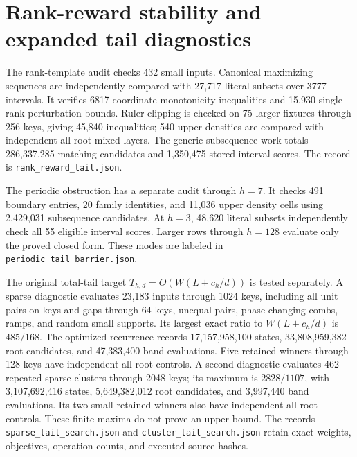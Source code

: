 \documentclass[11pt]{article}
\begin{document}
\section{Rank-reward stability and expanded tail diagnostics}
\label{app:rank-reward-stability}
The rank-template audit checks 432 small inputs. Canonical maximizing
sequences are independently compared with 27,717 literal subsets over
3777 intervals. It verifies 6817 coordinate monotonicity inequalities
and 15,930 single-rank perturbation bounds. Ruler clipping is checked
on 75 larger fixtures through 256 keys, giving 45,840 inequalities;
540 upper densities are compared with independent all-root mixed
layers. The generic subsequence work totals 286,337,285 matching
candidates and 1,350,475 stored interval scores. The record is
\texttt{rank\_reward\_tail.json}.

The periodic obstruction has a separate audit through $h=7$. It checks
491 boundary entries, 20 family identities, and 11,036 upper density
cells using 2,429,031 subsequence candidates. At $h=3$, 48,620 literal
subsets independently check all 55 eligible interval scores. Larger
rows through $h=128$ evaluate only the proved closed form. These modes
are labeled in \texttt{periodic\_tail\_barrier.json}.

The original total-tail target $T_{h,d}=O(W(L+c_h/d))$ is tested
separately. A sparse diagnostic evaluates 23,183 inputs through 1024
keys, including all unit pairs on keys and gaps through 64 keys,
unequal pairs, phase-changing combs, ramps, and random small supports.
Its largest exact ratio to $W(L+c_h/d)$ is $485/168$. The optimized
recurrence records 17,157,958,100 states, 33,808,959,382 root candidates,
and 47,383,400 band evaluations. Five retained winners through 128
keys have independent all-root controls. A second diagnostic evaluates
462 repeated sparse clusters through 2048 keys; its maximum is
$2828/1107$, with 3,107,692,416 states, 5,649,382,012 root candidates,
and 3,997,440 band evaluations. Its two small retained winners also
have independent all-root controls. These finite maxima do not prove
an upper bound. The records \texttt{sparse\_tail\_search.json} and
\texttt{cluster\_tail\_search.json} retain exact weights, objectives,
operation counts, and executed-source hashes.
\end{document}
